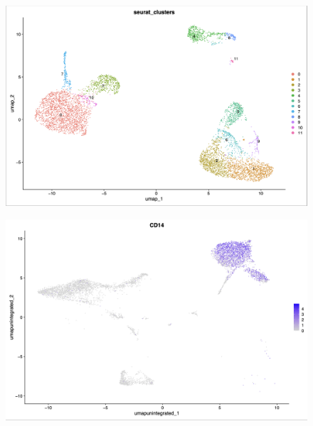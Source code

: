 \documentclass{article}
\begin{document}
\begin{figure}[h!]
    \centering
    \begin{minipage}{0.3\textwidth} %
        \centering
        \includegraphics[width=\textwidth,height=0.25\textheight,keepaspectratio]{figures/Figure1A.png} %
        \subcaption{}
        \label{fig:figure1A}
    \end{minipage}
    \hfill
    \begin{minipage}{0.6\textwidth} %
        \centering
        \includegraphics[width=\textwidth,height=0.4\textheight,keepaspectratio]{figures/Figure1B.png} %
        \subcaption{}
        \label{fig:figure1B}
    \end{minipage}
    

\end{figure}
\end{document}
